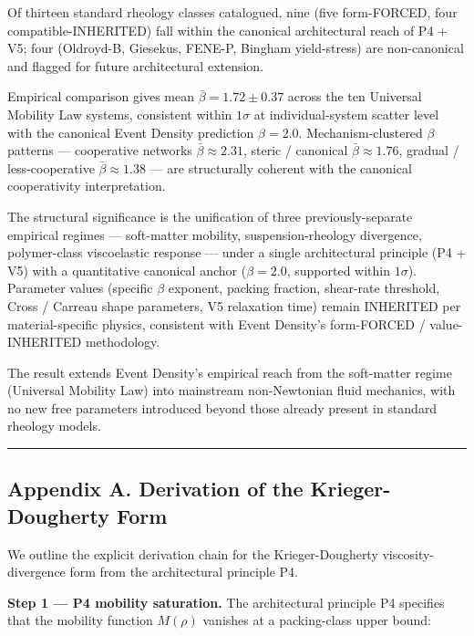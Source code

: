\documentclass[
  11pt,a4paper]{article}
\begin{document}
Of thirteen standard rheology classes catalogued, nine (five
form-FORCED, four compatible-INHERITED) fall within the canonical
architectural reach of P4 + V5; four (Oldroyd-B, Giesekus, FENE-P,
Bingham yield-stress) are non-canonical and flagged for future
architectural extension.

Empirical comparison gives mean \(\bar\beta = 1.72 \pm 0.37\) across the
ten Universal Mobility Law systems, consistent within \(1\sigma\) at
individual-system scatter level with the canonical Event Density
prediction \(\beta = 2.0\). Mechanism-clustered \(\beta\) patterns ---
cooperative networks \(\bar\beta \approx 2.31\), steric / canonical
\(\bar\beta \approx 1.76\), gradual / less-cooperative
\(\bar\beta \approx 1.38\) --- are structurally coherent with the
canonical cooperativity interpretation.

The structural significance is the unification of three
previously-separate empirical regimes --- soft-matter mobility,
suspension-rheology divergence, polymer-class viscoelastic response ---
under a single architectural principle (P4 + V5) with a quantitative
canonical anchor (\(\beta = 2.0\), supported within \(1\sigma\)).
Parameter values (specific \(\beta\) exponent, packing fraction,
shear-rate threshold, Cross / Carreau shape parameters, V5 relaxation
time) remain INHERITED per material-specific physics, consistent with
Event Density's form-FORCED / value-INHERITED methodology.

The result extends Event Density's empirical reach from the soft-matter
regime (Universal Mobility Law) into mainstream non-Newtonian fluid
mechanics, with no new free parameters introduced beyond those already
present in standard rheology models.

\begin{center}\rule{0.5\linewidth}{0.5pt}\end{center}

\subsection{Appendix A. Derivation of the Krieger-Dougherty
Form}\label{appendix-a.-derivation-of-the-krieger-dougherty-form}

We outline the explicit derivation chain for the Krieger-Dougherty
viscosity-divergence form from the architectural principle P4.

\textbf{Step 1 --- P4 mobility saturation.} The architectural principle
P4 specifies that the mobility function \(M(\rho)\) vanishes at a
packing-class upper bound:
\end{document}
